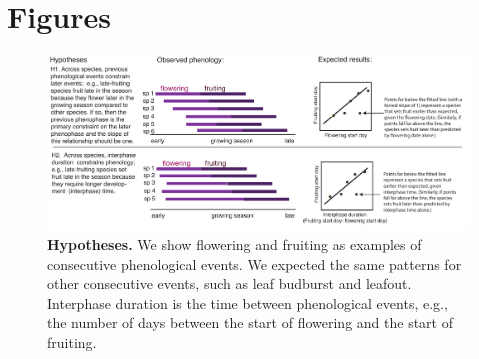 \documentclass{article}
\begin{document}
\section* {Figures}
\begin{figure}[p]
  \centering
  \includegraphics{../analyses/figures/hypotheses3.pdf} 
   
  \caption{\textbf{Hypotheses.} We show flowering and fruiting as examples of consecutive phenological events. We expected the same patterns for other consecutive events, such as leaf budburst and leafout. Interphase duration is the time between phenological events, e.g., the number of days between the start of flowering and the start of fruiting.} 
 \label{fig:hyp}
\end{figure}
 
\end{document}
